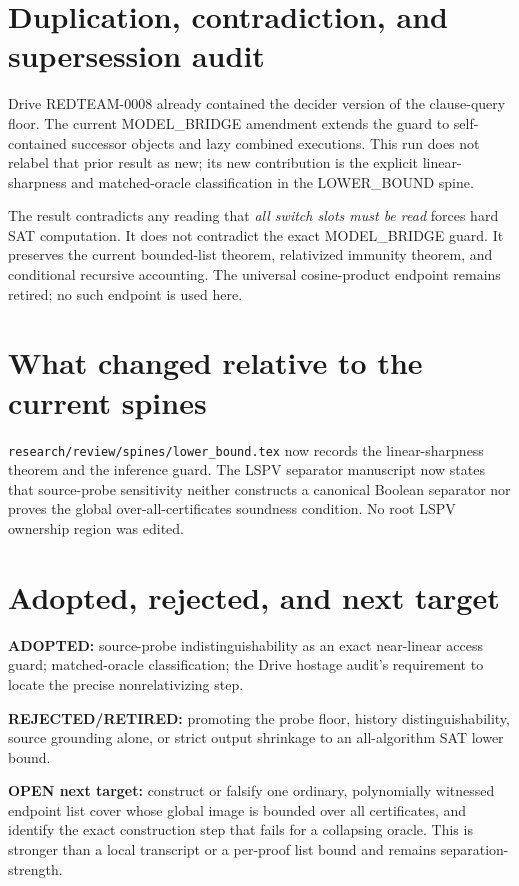 \documentclass[11pt]{article}
\begin{document}
\section{Duplication, contradiction, and supersession audit}
Drive REDTEAM-0008 already contained the decider version of the
clause-query floor. The current MODEL\_BRIDGE amendment extends the guard
to self-contained successor objects and lazy combined executions. This
run does not relabel that prior result as new; its new contribution is the
explicit linear-sharpness and matched-oracle classification in the
LOWER\_BOUND spine.

The result contradicts any reading that \emph{all switch slots must be
read} forces hard SAT computation. It does not contradict the exact
MODEL\_BRIDGE guard. It preserves the current bounded-list theorem,
relativized immunity theorem, and conditional recursive accounting. The
universal cosine-product endpoint remains retired; no such endpoint is
used here.

\section{What changed relative to the current spines}
\texttt{research/review/spines/lower\_bound.tex} now records the
linear-sharpness theorem and the inference guard. The LSPV separator
manuscript now states that source-probe sensitivity neither constructs a
canonical Boolean separator nor proves the global over-all-certificates
soundness condition. No root LSPV ownership region was edited.

\section{Adopted, rejected, and next target}
\textbf{ADOPTED:} source-probe indistinguishability as an exact
near-linear access guard; matched-oracle classification; the Drive
hostage audit's requirement to locate the precise nonrelativizing step.

\textbf{REJECTED/RETIRED:} promoting the probe floor, history
distinguishability, source grounding alone, or strict output shrinkage to
an all-algorithm SAT lower bound.

\textbf{OPEN next target:} construct or falsify one ordinary,
polynomially witnessed endpoint list cover whose global image is bounded
over all certificates, and identify the exact construction step that
fails for a collapsing oracle. This is stronger than a local transcript
or a per-proof list bound and remains separation-strength.
\end{document}
